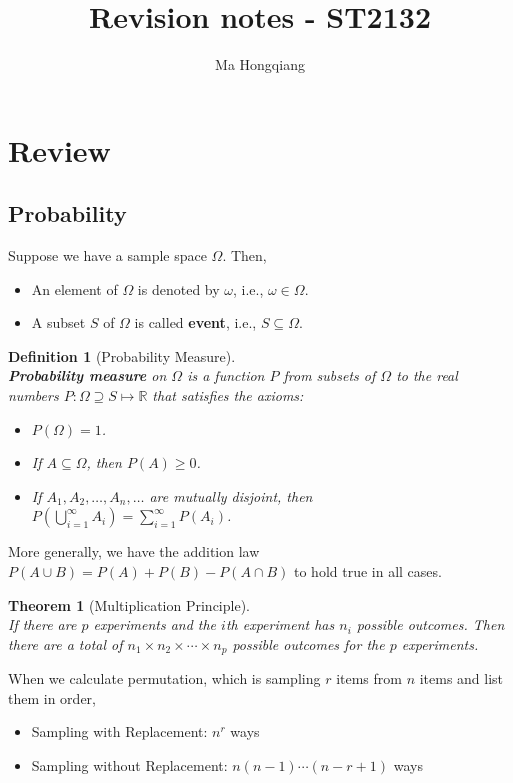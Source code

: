 \documentclass[12pt]{article}
\newtheorem{definition}{Definition}[section]
\newtheorem{theorem}{Theorem}[section]
\theoremstyle{definition}
\begin{document}
\title{Revision notes - ST2132}
\author{Ma Hongqiang}
\maketitle
\tableofcontents


\twocolumn
\section{Review}
\subsection{Probability}
Suppose we have a sample space $\Omega$. Then, 
\begin{itemize}
  \item An element of $\Omega$ is denoted by $\omega$, i.e., $\omega \in \Omega$.
  \item A subset $S$ of $\Omega$ is called \textbf{event}, i.e., $S\subseteq \Omega$.
\end{itemize}
\begin{definition}[Probability Measure]
\hfill\\\normalfont \textbf{Probability measure} on $\Omega$ is a function $P$ from subsets of $\Omega$ to the real numbers
$
P:\Omega \supseteq S \mapsto \mathbb{R}
$
that satisfies the axioms:
\begin{itemize}
  \item $P(\Omega) = 1$.
  \item If $A\subseteq \Omega$, then $P(A)\geq 0$.
  \item If $A_1, A_2, \ldots, A_n,\ldots$ are mutually disjoint, then \\$P\left(\bigcup_{i=1}^\infty A_i\right) = \sum_{i=1}^\infty P(A_i)$.
\end{itemize}
\end{definition}
More generally, we have the addition law
$
P(A\cup B) = P(A)+P(B)-P(A\cap B)
$
to hold true in all cases.
\begin{theorem}[Multiplication Principle]
\hfill\\\normalfont If there are $p$ experiments and the $i$th experiment has $n_i$ possible outcomes. Then there are a total of $n_1\times n_2\times \cdots\times n_p$ possible outcomes for the $p$ experiments.
\end{theorem}
When we calculate permutation, which is sampling $r$ items from $n$ items and list them in order, 
\begin{itemize}
  \item Sampling with Replacement: $n^r$ ways
  \item Sampling without Replacement: $n(n-1)\cdots(n-r+1)$ ways
\end{itemize}
\end{document}
